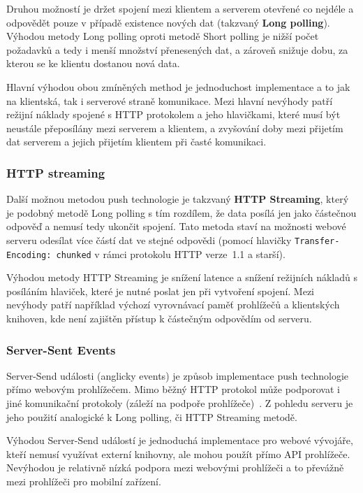 Druhou možností je držet spojení mezi klientem a serverem otevřené co nejdéle a odpovědět pouze v případě existence nových dat (takzvaný \textbf{Long polling}).
Výhodou metody Long polling oproti metodě Short polling je nižší počet požadavků a tedy i menší množství přenesených dat, a zároveň snižuje dobu, za kterou se ke klientu dostanou nová data.

Hlavní výhodou obou zmíněných method je jednoduchost implementace a to jak na klientská, tak i serverové straně komunikace.
Mezi hlavní nevýhody patří režijní náklady spojené s \gls{HTTP} protokolem a jeho hlavičkami, které musí být neustále přeposílány mezi serverem a klientem, a zvyšování doby  mezi přijetím dat serverem a jejich přijetím klientem při časté komunikaci.~\cite{pushpull:issuesRFC}

\subsubsection{HTTP streaming}

Další možnou metodou push technologie je takzvaný \textbf{\gls{HTTP} Streaming}, který je podobný metodě Long polling s tím rozdílem, že data posílá jen jako částečnou odpověď a nemusí tedy ukončit spojení.
Tato metoda staví na možnosti webové serveru odesílat více částí dat ve stejné odpovědi (pomocí hlavičky \texttt{Transfer-Encoding: chunked} v rámci protokolu \gls{HTTP} verze~1.1 a starší).

Výhodou metody \gls{HTTP} Streaming je snížení latence a snížení režijních nákladů s posíláním hlaviček, které je nutné poslat jen při vytvoření spojení.
Mezi nevýhody patří například výchozí vyrovnávací paměť prohlížečů a klientských knihoven, kde není zajištěn přístup k částečným odpovědím od serveru.~\cite{pushpull:issuesRFC}

\subsubsection{Server-Sent Events}

Server-Send události (anglicky events) je způsob implementace push technologie přímo webovým prohlížečem.
Mimo běžný \gls{HTTP} protokol může podporovat i jiné komunikační protokoly (záleží na podpoře prohlížeče)~\cite{pushpull:events}.
Z pohledu serveru je jeho použití analogické k Long polling, či HTTP Streaming metodě.~\cite{pushpull:compare}

Výhodou Server-Send událostí je jednoduchá implementace pro webové vývojáře, kteří nemusí využívat externí knihovny, ale mohou použít přímo \gls{API} prohlížeče.
Nevýhodou je relativně nízká podpora mezi webovými prohlížeči a to převážně mezi prohlížeči pro mobilní zařízení.~\cite{pushpull:issuesRFC}

